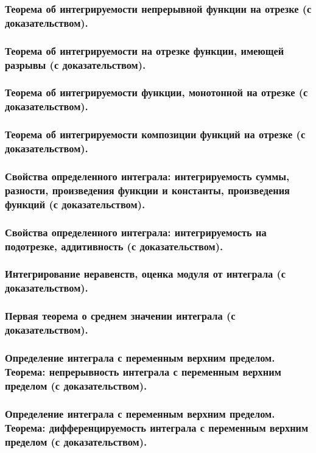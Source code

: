 \documentclass[10pt]{article}
\begin{document}
    \subsubsection{Теорема об интегрируемости непрерывной функции на отрезке (с доказательством).}
    \subsubsection{Теорема об интегрируемости на отрезке функции, имеющей разрывы (с доказательством).}
    \subsubsection{Теорема об интегрируемости функции, монотонной на отрезке (с доказательством).}
    \subsubsection{Теорема об интегрируемости композиции функций на отрезке (с доказательством).}
    \subsubsection{Свойства определенного интеграла: интегрируемость суммы, разности, произведения функции и константы, произведения функций (с доказательством).}
    \subsubsection{Свойства определенного интеграла: интегрируемость на подотрезке, аддитивность (с доказательством).}
    \subsubsection{Интегрирование неравенств, оценка модуля от интеграла (с доказательством).}
    \subsubsection{Первая теорема о среднем значении интеграла (с доказательством).}
    \subsubsection{Определение интеграла с переменным верхним пределом. Теорема: непрерывность интеграла с переменным верхним пределом (с доказательством).}
    \subsubsection{Определение интеграла с переменным верхним пределом. Теорема: дифференцируемость интеграла с переменным верхним пределом (с доказательством).}
\end{document}
